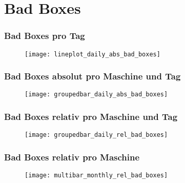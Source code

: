 \section{Bad Boxes}
\begin{frame}
    \frametitle{Bad Boxes pro Tag}

    \begin{figure}
        \centering
        \texttt{[image: lineplot\_daily\_abs\_bad\_boxes]}
    \end{figure}

\end{frame}

\begin{frame}
    \frametitle{Bad Boxes absolut pro Maschine und Tag}

    \begin{figure}
        \centering
        \texttt{[image: groupedbar\_daily\_abs\_bad\_boxes]}
    \end{figure}

\end{frame}

\begin{frame}
    \frametitle{Bad Boxes relativ pro Maschine und Tag}

    \begin{figure}
        \centering
        \texttt{[image: groupedbar\_daily\_rel\_bad\_boxes]}
    \end{figure}

\end{frame}

\begin{frame}
    \frametitle{Bad Boxes relativ pro Maschine}

    \begin{figure}
        \centering
        \texttt{[image: multibar\_monthly\_rel\_bad\_boxes]}
    \end{figure}

\end{frame}